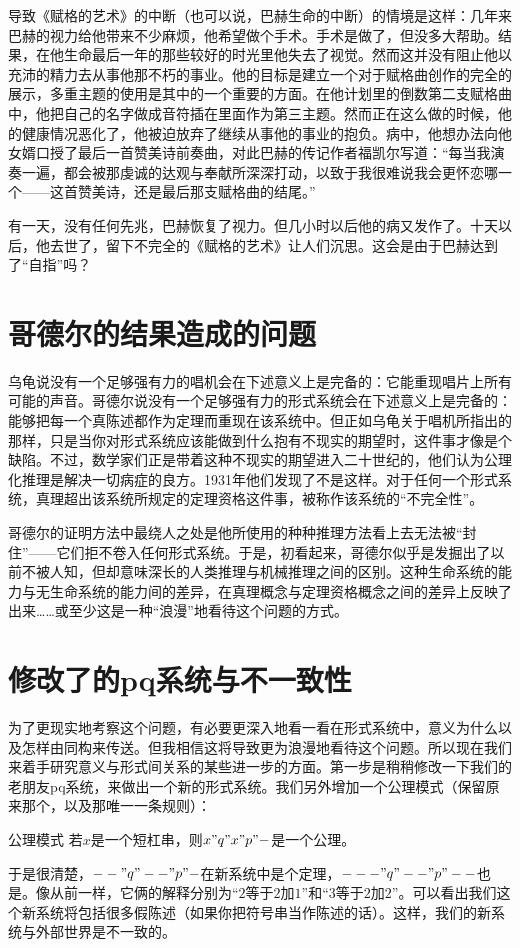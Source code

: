 导致《赋格的艺术》的中断（也可以说，巴赫生命的中断）的情境是这样：几年来巴赫的视力给他带来不少麻烦，他希望做个手术。手术是做了，但没多大帮助。结果，在他生命最后一年的那些较好的时光里他失去了视觉。然而这并没有阻止他以充沛的精力去从事他那不朽的事业。他的目标是建立一个对于赋格曲创作的完全的展示，多重主题的使用是其中的一个重要的方面。在他计划里的倒数第二支赋格曲中，他把自己的名字做成音符插在里面作为第三主题。然而正在这么做的时候，他的健康情况恶化了，他被迫放弃了继续从事他的事业的抱负。病中，他想办法向他女婿口授了最后一首赞美诗前奏曲，对此巴赫的传记作者福凯尔写道：“每当我演奏一遍，都会被那虔诚的达观与奉献所深深打动，以致于我很难说我会更怀恋哪一个——这首赞美诗，还是最后那支赋格曲的结尾。”

有一天，没有任何先兆，巴赫恢复了视力。但几小时以后他的病又发作了。十天以后，他去世了，留下不完全的《赋格的艺术》让人们沉思。这会是由于巴赫达到了“自指”吗？

\section{哥德尔的结果造成的问题}

乌龟说没有一个足够强有力的唱机会在下述意义上是完备的：它能重现唱片上所有可能的声音。哥德尔说没有一个足够强有力的形式系统会在下述意义上是完备的：能够把每一个真陈述都作为定理而重现在该系统中。但正如乌龟关于唱机所指出的那样，只是当你对形式系统应该能做到什么抱有不现实的期望时，这件事才像是个缺陷。不过，数学家们正是带着这种不现实的期望进入二十世纪的，他们认为公理化推理是解决一切病症的良方。1931年他们发现了不是这样。对于任何一个形式系统，真理超出该系统所规定的定理资格这件事，被称作该系统的“不完全性”。

哥德尔的证明方法中最绕人之处是他所使用的种种推理方法看上去无法被“封住”——它们拒不卷入任何形式系统。于是，初看起来，哥德尔似乎是发掘出了以前不被人知，但却意味深长的人类推理与机械推理之间的区别。这种生命系统的能力与无生命系统的能力间的差异，在真理概念与定理资格概念之间的差异上反映了出来……或至少这是一种“浪漫”地看待这个问题的方式。

\section{修改了的pq系统与不一致性}

为了更现实地考察这个问题，有必要更深入地看一看在形式系统中，意义为什么以及怎样由同构来传送。但我相信这将导致更为浪漫地看待这个问题。所以现在我们来着手研究意义与形式间关系的某些进一步的方面。第一步是稍稍修改一下我们的老朋友pq系统，来做出一个新的形式系统。我们另外增加一个公理模式（保留原来那个，以及那唯一一条规则）：
\begin{thm}{公理模式}
若$x$是一个短杠串，则$x"q"x"p"-$是一个公理。
\end{thm}
于是很清楚，$--"q"--"p"-$在新系统中是个定理，$---"q"--"p"--$也是。像从前一样，它俩的解释分别为“$2$等于$2$加$1$”和“$3$等于$2$加$2$”。可以看出我们这个新系统将包括很多假陈述（如果你把符号串当作陈述的话）。这样，我们的新系统与外部世界是不一致的。

